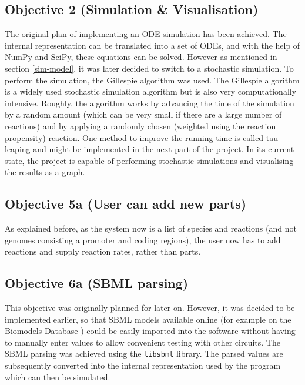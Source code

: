\documentclass{article}
\begin{document}
	\subsection{Objective 2 (Simulation \& Visualisation)} 
	The original plan of implementing an ODE simulation has been achieved. The internal representation can be translated into a set of ODEs, and with the help of NumPy and SciPy, these equations can be solved. However as mentioned in section \ref{sim-model}, it was later decided to switch to a stochastic simulation. To perform the simulation, the Gillespie algorithm \cite{gillespie} was used. The Gillespie algorithm is a widely used stochastic simulation algorithm but is also very computationally intensive. Roughly, the algorithm works by advancing the time of the simulation by a random amount (which can be very small if there are a large number of reactions) and by applying a randomly chosen (weighted using the reaction propensity) reaction. One method to improve the running time is called tau-leaping and might be implemented in the next part of the project. In its current state, the project is capable of performing stochastic simulations and visualising the results as a graph.
	
	\subsection{Objective 5a (User can add new parts)} 
	As explained before, as the system now is a list of species and reactions (and not genomes consisting a promoter and coding regions), the user now has to add reactions and supply reaction rates, rather than parts.
	
	\subsection{Objective 6a (SBML parsing)} 
	This objective was originally planned for later on. However, it was decided to be implemented earlier, so that SBML models available online (for example on the Biomodels Database \cite{biomodels}) could be easily imported into the software without having to manually enter values to allow convenient testing with other circuits. The SBML parsing was achieved using the \verb|libsbml| library. The parsed values are subsequently converted into the internal representation used by the program which can then be simulated. 
	
\end{document}
